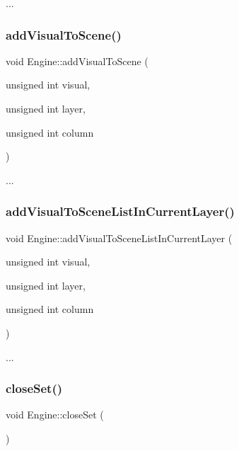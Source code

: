 ... \mbox{\label{class_engine_afc245ab31c528fe807f45309772de07b}} 
\subsubsection{\texorpdfstring{add\+Visual\+To\+Scene()}{addVisualToScene()}}
{\footnotesize\ttfamily void Engine\+::add\+Visual\+To\+Scene (\begin{DoxyParamCaption}\item[{unsigned int}]{visual,  }\item[{unsigned int}]{layer,  }\item[{unsigned int}]{column }\end{DoxyParamCaption})}

... \mbox{\label{class_engine_a6e9b7c17e564a3f10c9cb7301d64ecb4}} 
\subsubsection{\texorpdfstring{add\+Visual\+To\+Scene\+List\+In\+Current\+Layer()}{addVisualToSceneListInCurrentLayer()}}
{\footnotesize\ttfamily void Engine\+::add\+Visual\+To\+Scene\+List\+In\+Current\+Layer (\begin{DoxyParamCaption}\item[{unsigned int}]{visual,  }\item[{unsigned int}]{layer,  }\item[{unsigned int}]{column }\end{DoxyParamCaption})}

... \mbox{\label{class_engine_a360e63d1c939cc8a70f0cd2fd289fc87}} 
\subsubsection{\texorpdfstring{close\+Set()}{closeSet()}}
{\footnotesize\ttfamily void Engine\+::close\+Set (\begin{DoxyParamCaption}{ }\end{DoxyParamCaption})}

